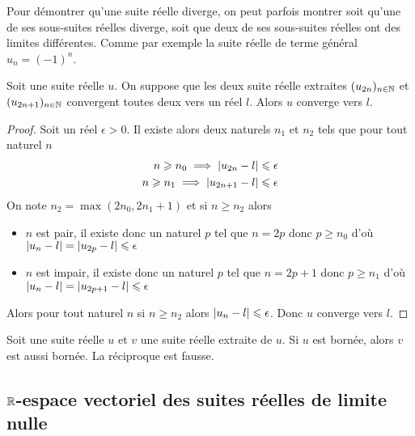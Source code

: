 Pour démontrer qu'une suite réelle diverge, on peut parfois montrer soit qu'une
de ses sous-suites réelles diverge, soit que deux de ses sous-suites réelles ont
des limites différentes. Comme par exemple la suite réelle de terme général
\(u_n = (-1)^n\).
\begin{prop}
    Soit une suite réelle \(u\). On suppose que les deux suite réelle extraites
    \((u_{2n})_{n \in \mathbb{N}}\) et \((u_{2n+1})_{n \in \mathbb{N}}\) convergent toutes deux
    vers un réel \(l\). Alors \(u\) converge vers \(l\).
\end{prop}
\begin{proof}
    Soit un réel \(\epsilon>0\). Il existe alors deux naturels \(n_1\) et \(n_2\)
    tels que pour tout naturel \(n\)
    \begin{align}
        n \geqslant n_0 \implies \left\lvert u_{2n}-l\right\rvert \leqslant \epsilon \\  n \geqslant
        n_1 \implies \left\lvert u_{2n+1}-l\right\rvert \leqslant \epsilon
    \end{align}
    On note \(n_2 = \max(2n_0,2n_1+1)\) et si \(n \geqslant n_2\) alors
    \begin{itemize}
        \item \(n\) est pair, il existe donc un naturel \(p\) tel que \(n = 2p\)
            donc \(p\geqslant n_0\) d'où \(\left\lvert u_n-l\right\rvert = \left\lvert u_{2p}-l\right\rvert \leqslant
            \epsilon\)
        \item \(n\) est impair, il existe donc un naturel \(p\) tel que \(n = 2p+1\)
            donc \(p\geqslant n_1\) d'où \(\left\lvert u_n-l\right\rvert = \left\lvert u_{2p+1}-l\right\rvert \leqslant
            \epsilon\)
    \end{itemize}
    Alors pour tout naturel \(n\) si \(n \geqslant n_2\) alors \(\left\lvert u_n-l\right\rvert
    \leqslant \epsilon\). Donc \(u\) converge vers \(l\).
\end{proof}
\begin{prop}
    Soit une suite réelle \(u\) et \(v\) une suite réelle extraite de \(u\). Si
    \(u\) est bornée, alors \(v\) est aussi bornée. La réciproque est fausse.
\end{prop}

\subsection{\(\mathbb{R}\)-espace vectoriel des suites réelles de limite nulle}

